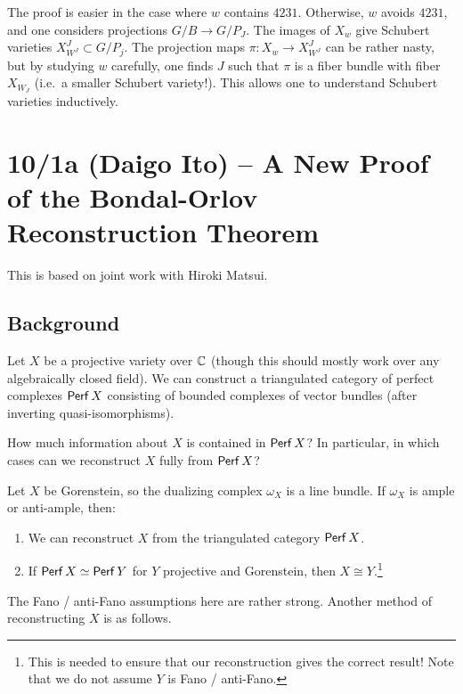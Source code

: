 \documentclass{amsart}
\begin{document}
The proof is easier in the case where $w$ contains $4231$.
Otherwise, $w$ avoids $4231$, and one considers projections $G/B \to G/P_J$.
The images of $X_w$ give Schubert varieties $X^J_{W^J} \subset G/P_j$.
The projection maps $\pi: X_w \to X^J_{W^J}$ can be rather nasty, but by studying $w$ carefully, one finds $J$ such that $\pi$ is a fiber bundle with fiber $X_{W_J}$ (i.e.\ a smaller Schubert variety!).
This allows one to understand Schubert varieties inductively.

\section{10/1a (Daigo Ito) -- A New Proof of the Bondal-Orlov Reconstruction Theorem}

This is based on joint work with Hiroki Matsui.

\subsection{Background}

Let $X$ be a projective variety over $\mathbb{C}$ (though this should mostly work over any algebraically closed field).
We can construct a triangulated category of perfect complexes $\mathsf{Perf}\, X$ consisting of bounded complexes of vector bundles (after inverting quasi-isomorphisms).

\begin{qn}
	How much information about $X$ is contained in $\mathsf{Perf}\, X$?
	In particular, in which cases can we reconstruct $X$ fully from $\mathsf{Perf}\, X$?
\end{qn}

\begin{thm}
	Let $X$ be Gorenstein, so the dualizing complex $\omega_X$ is a line bundle.
	If $\omega_X$ is ample or anti-ample, then:
	\begin{enumerate}
		\item We can reconstruct $X$ from the triangulated category $\mathsf{Perf}\, X$.
		\item If $\mathsf{Perf}\, X \simeq \mathsf{Perf}\, Y$ for $Y$ projective and Gorenstein, then $X \cong Y$.\footnote{This is needed to ensure that our reconstruction gives the correct result!
			Note that we do not assume $Y$ is Fano / anti-Fano.}
	\end{enumerate}
\end{thm}

The Fano / anti-Fano assumptions here are rather strong.
Another method of reconstructing $X$ is as follows.
\end{document}
